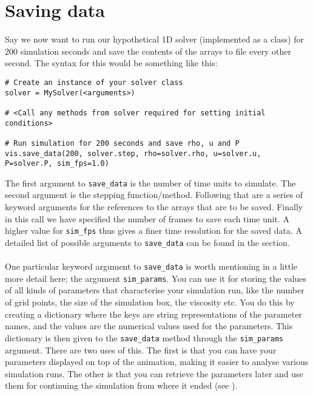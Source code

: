 \documentclass{article}
\newcommand{\ttt}[1]{\texttt{#1}}
\begin{document}
\section{Saving data}
\label{sec:save}
Say we now want to run our hypothetical 1D solver (implemented as a class) for 200 simulation seconds and save the contents of the arrays to file every other second. The syntax for this would be something like this:\\
\begin{minipage}{\linewidth}
\begin{lstlisting}
# Create an instance of your solver class
solver = MySolver(<arguments>)

# <Call any methods from solver required for setting initial conditions>

# Run simulation for 200 seconds and save rho, u and P
vis.save_data(200, solver.step, rho=solver.rho, u=solver.u, P=solver.P, sim_fps=1.0)
\end{lstlisting}
\end{minipage}
The first argument to \ttt{save\_data} is the number of time units to simulate. The second argument is the stepping function/method. Following that are a series of keyword arguments for the references to the arrays that are to be saved. Finally in this call we have specified the number of frames to save each time unit. A higher value for \ttt{sim\_fps} thus gives a finer time resolution for the saved data. A detailed list of possible arguments to \ttt{save\_data} can be found in the  section.\\\\
One particular keyword argument to \ttt{save\_data} is worth mentioning in a little more detail here; the argument \ttt{sim\_params}. You can use it for storing the values of all kinds of parameters that characterise your simulation run, like the number of grid points, the size of the simulation box, the viscosity etc. You do this by creating a dictionary where the keys are string representations of the parameter names, and the values are the numerical values used for the parameters. This dictionary is then given to the \ttt{save\_data} method through the \ttt{sim\_params} argument. There are two uses of this. The first is that you can have your parameters displayed on top of the animation, making it easier to analyse various simulation runs. The other is that you can retrieve the parameters later and use them for continuing the simulation from where it ended (see ). \\\\
\end{document}
